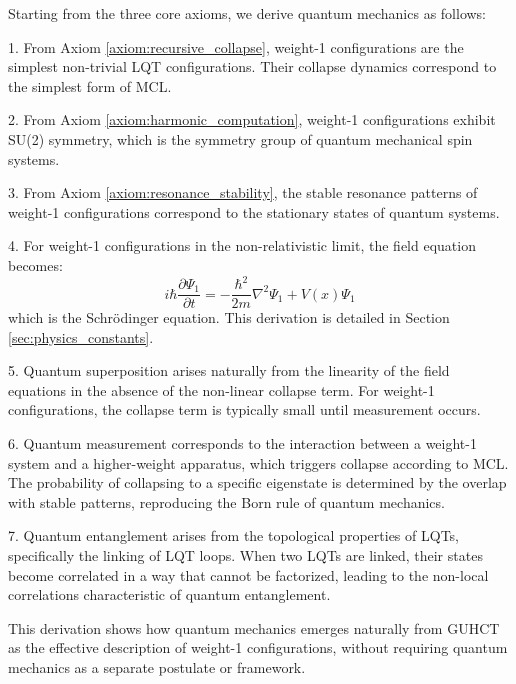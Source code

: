 \documentclass[11pt,a4paper]{article}
\makeatletter
\renewenvironment{proof}[1][\proofname]{\par
  \pushQED{\qed}%
  \normalfont \topsep6\p@\@plus6\p@\relax
  \trivlist
  \item[\hskip\labelsep
        \itshape
    #1\@addpunct{.}]\ignorespaces
}{%
  \popQED\endtrivlist\@endpefalse
}
\makeatother
\begin{document}
\begin{proof}
Starting from the three core axioms, we derive quantum mechanics as follows:

1. From Axiom \ref{axiom:recursive_collapse}, weight-1 configurations are the simplest non-trivial LQT configurations. Their collapse dynamics correspond to the simplest form of MCL.

2. From Axiom \ref{axiom:harmonic_computation}, weight-1 configurations exhibit SU(2) symmetry, which is the symmetry group of quantum mechanical spin systems.

3. From Axiom \ref{axiom:resonance_stability}, the stable resonance patterns of weight-1 configurations correspond to the stationary states of quantum systems.

4. For weight-1 configurations in the non-relativistic limit, the field equation becomes:
   \begin{equation}
   i\hbar\frac{\partial\Psi_1}{\partial t} = -\frac{\hbar^2}{2m}\nabla^2\Psi_1 + V(x)\Psi_1
   \end{equation}
   which is the Schrödinger equation. This derivation is detailed in Section \ref{sec:physics_constants}.

5. Quantum superposition arises naturally from the linearity of the field equations in the absence of the non-linear collapse term. For weight-1 configurations, the collapse term is typically small until measurement occurs.

6. Quantum measurement corresponds to the interaction between a weight-1 system and a higher-weight apparatus, which triggers collapse according to MCL. The probability of collapsing to a specific eigenstate is determined by the overlap with stable patterns, reproducing the Born rule of quantum mechanics.

7. Quantum entanglement arises from the topological properties of LQTs, specifically the linking of LQT loops. When two LQTs are linked, their states become correlated in a way that cannot be factorized, leading to the non-local correlations characteristic of quantum entanglement.

This derivation shows how quantum mechanics emerges naturally from GUHCT as the effective description of weight-1 configurations, without requiring quantum mechanics as a separate postulate or framework.
\end{proof}
\end{document}
